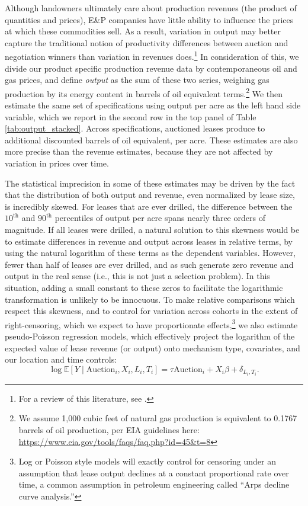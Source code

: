 Although landowners ultimately care about production revenues (the product of quantities and prices), E\&P companies have little ability to influence the prices at which these commodities sell.  As a result, variation in output may better capture the traditional notion of productivity differences between auction and negotiation winners than variation in revenues does.\footnote{For a review of this literature, see \cite{syverson2011determines}.}  In consideration of this, we divide our product specific production revenue data by contemporaneous oil and gas prices, and define \textit{output} as the sum of these two series, weighing gas production by its energy content in barrels of oil equivalent terms.\footnote{We assume 1,000 cubic feet of natural gas production is equivalent to 0.1767 barrels of oil production, per EIA guidelines here: \url{https://www.eia.gov/tools/faqs/faq.php?id=45&t=8}}  We then estimate the same set of specifications using output per acre as the left hand side variable, which we report in the second row in the top panel of Table \ref{tab:output_stacked}. Across specifications, auctioned leases produce  to  additional discounted barrels of oil equivalent, per acre. These estimates are also more precise than the revenue estimates, because they are not affected by variation in prices over time. 

The statistical imprecision in some of these estimates may be driven by the fact that the distribution of both output and revenue, even normalized by lease size, is incredibly skewed. For leases that are ever drilled, the difference between the $10^{\text{th}}$ and $90^{\text{th}}$ percentiles of output per acre spans nearly three orders of magnitude. If all leases were drilled, a natural solution to this skewness would be to estimate differences in revenue and output across leases in relative terms, by using the natural logarithm of these terms as the dependent variables. However, fewer than half of leases are ever drilled, and as such generate zero revenue and output in the real sense (i.e., this is not just a selection problem).  In this situation, adding a small constant to these zeros to facilitate the logarithmic transformation is unlikely to be innocuous.  To make relative comparisons which respect this skewness, and to control for variation across cohorts in the extent of right-censoring, which we expect to have proportionate effects,\footnote{Log or Poisson style models will exactly control for censoring under an assumption that lease output declines at a constant proportional rate over time, a common assumption in petroleum engineering called ``Arps decline curve analysis.''} we also estimate pseudo-Poisson regression models, which effectively project the logarithm of the expected value of lease revenue (or output) onto mechanism type, covariates, and our location and time controls:
\begin{equation*}
 	\log \mathbb{E}\left[Y\mid \text{Auction}_i, X_i, L_i, T_i\right] = \tau \text{Auction}_i + X_i \beta + \delta_{L_i,T_i}. \label{eq:mainAuctionPoisson}
\end{equation*} 

